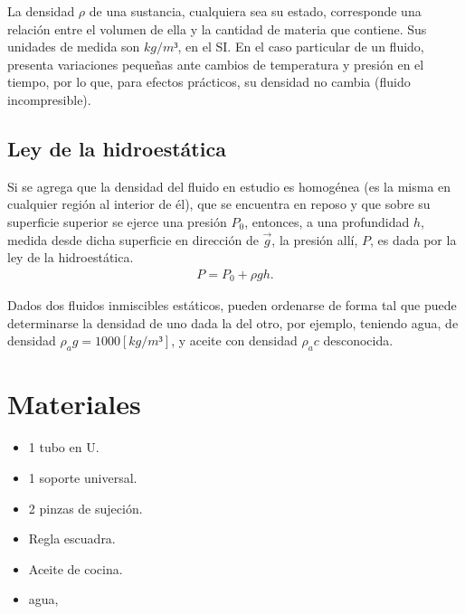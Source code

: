 \documentclass[a4paper, 12p]{article}
\begin{document}
La densidad $\rho$ de una sustancia, cualquiera sea su estado, corresponde una relación entre el volumen de ella y la cantidad de materia que contiene. Sus unidades de medida son $kg/m³$, en el SI. En el caso particular de un fluido, 
presenta variaciones pequeñas ante cambios de temperatura y presión en el tiempo, por lo que, para efectos prácticos, su densidad no cambia (fluido incompresible).

\subsection*{Ley de la hidroestática}
Si se agrega que la densidad del fluido en estudio es homogénea (es la misma en cualquier región al interior de él), que se encuentra en reposo y que sobre su superficie superior se ejerce una presión $P_0$, entonces, a una profundidad $h$, 
medida desde dicha superficie en dirección de $\vec{g}$, la presión allí, $P$, es dada por la ley de la hidroestática.
\begin{align}
      P=P_0 +  \rho gh.
      \label{eq: presion-h}
\end{align}

Dados dos fluidos inmiscibles estáticos, pueden ordenarse de forma tal que puede determinarse la densidad de uno dada la del otro, por ejemplo, teniendo agua, de densidad $\rho_ag = 1000[kg/m³]$, y aceite con densidad $\rho_ac$ desconocida.


\newpage
\section{Materiales}


\begin{itemize}
      \item 1 tubo en U.
      \item 1 soporte universal.
      \item 2 pinzas de sujeción.
      \item Regla escuadra.
      \item Aceite de cocina.
      \item agua,
\end{itemize}    
\end{document}
